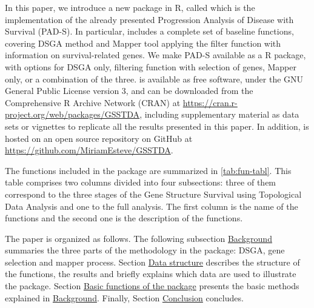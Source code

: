 In this paper, we introduce a new package in R, called  which is the implementation of the already presented Progression Analysis of Disease with Survival (PAD-S). In particular,  includes a complete set of baseline functions, covering DSGA method and Mapper tool applying the filter function with information on survival-related genes. We make PAD-S available as a R package, with options for DSGA only, filtering function with selection of genes, Mapper only, or a combination of the three.  is available as free software, under the GNU General Public License version 3, and can be downloaded from the Comprehensive R Archive Network (CRAN) at \url{https://cran.r-project.org/web/packages/GSSTDA}, including supplementary material as data sets or vignettes to replicate all the results presented in this paper. In addition,  is hosted on an open source repository on GitHub at \url{https://github.com/MiriamEsteve/GSSTDA}.

The functions included in the  package are summarized in \ref{tab:fun-tabl}. This table comprises two columns divided into four subsections: three of them correspond to the three stages of the Gene Structure Survival using Topological Data Analysis and one to the full analysis. The first column is the name of the functions and the second one is the description of the functions.

The paper is organized as follows. The following subsection \protect\hyperlink{section2}{Background} summaries the three parts of the methodology in the  package: DSGA, gene selection and mapper process. Section \protect\hyperlink{section3}{Data structure} describes the structure of the functions, the results and briefly explains which data are used to illustrate the package. Section \protect\hyperlink{section4}{Basic functions of the package} presents the basic methods explained in \protect\hyperlink{section2}{Background}. Finally, Section \protect\hyperlink{section5}{Conclusion} concludes.

